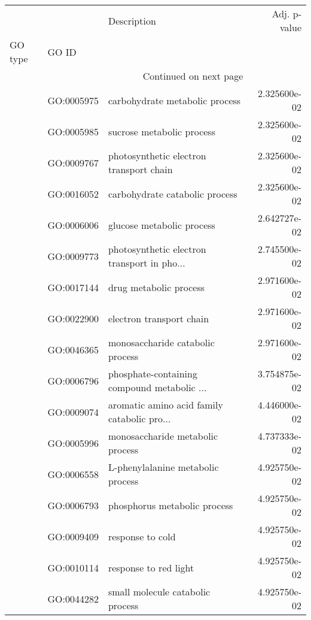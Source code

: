 \begin{longtable}{lllr}
\toprule
   &            &                                  Description &  Adj. p-value \\
GO type & GO ID &                                              &               \\
\midrule
\endhead
\midrule
\multicolumn{3}{r}{{Continued on next page}} \\
\midrule
\endfoot

\bottomrule
\endlastfoot
\multirow{18}{*}{BP} & GO:0005975 &               carbohydrate metabolic process &  2.325600e-02 \\
   & GO:0005985 &                    sucrose metabolic process &  2.325600e-02 \\
   & GO:0009767 &      photosynthetic electron transport chain &  2.325600e-02 \\
   & GO:0016052 &               carbohydrate catabolic process &  2.325600e-02 \\
   & GO:0006006 &                    glucose metabolic process &  2.642727e-02 \\
   & GO:0009773 &  photosynthetic electron transport in pho... &  2.745500e-02 \\
   & GO:0017144 &                       drug metabolic process &  2.971600e-02 \\
   & GO:0022900 &                     electron transport chain &  2.971600e-02 \\
   & GO:0046365 &             monosaccharide catabolic process &  2.971600e-02 \\
   & GO:0006796 &  phosphate-containing compound metabolic ... &  3.754875e-02 \\
   & GO:0009074 &  aromatic amino acid family catabolic pro... &  4.446000e-02 \\
   & GO:0005996 &             monosaccharide metabolic process &  4.737333e-02 \\
   & GO:0006558 &            L-phenylalanine metabolic process &  4.925750e-02 \\
   & GO:0006793 &                 phosphorus metabolic process &  4.925750e-02 \\
   & GO:0009409 &                             response to cold &  4.925750e-02 \\
   & GO:0010114 &                        response to red light &  4.925750e-02 \\
   & GO:0044282 &             small molecule catabolic process &  4.925750e-02 \\

\end{longtable}
